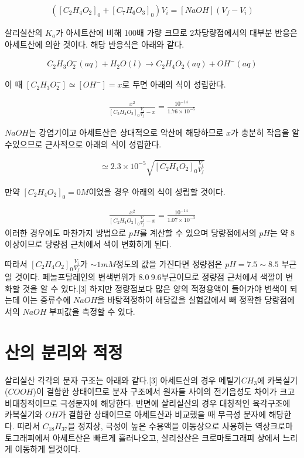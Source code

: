 \documentclass[%
 reprint,
 amsmath,amssymb,
 aps,
]{revtex4-2}
\begin{document}
\begin{align}
	([C_{2}H_{4}O_{2}]_{0}+[C_{7}H_{6}O_{3}]_{0})V_{i} = [NaOH](V_{f}-V_{i})
\end{align}

살리실산의 $K_{a}$가 아세트산에 비해 100배 가량 크므로 2차당량점에서의 대부분 반응은 아세트산에 의한 것이다. 해당 반응식은 아래와 같다.

\begin{align}
	C_{2}H_{3}O_{2}^{-}(aq) + H_{2}O(l) \rightarrow C_{2}H_{4}O_{2}(aq)+ OH^{-}(aq)
\end{align}

이 때 $[C_{2}H_{3}O_{2}^{-}] \simeq [OH^{-}] = x$로 두면 아래의 식이 성립한다.

\begin{align}
	\frac{x^{2}}{[C_{2}H_{4}O_{2}]_{0}\frac{V_{i}}{V_{f}}-x} = \frac{10^{-14}}{1.76\times10^{-5}}
\end{align}

$NaOH$는 강염기이고 아세트산은 상대적으로 약산에 해당하므로 $x$가 충분히 작음을 알수있으므로 근사적으로 아래의 식이 성립한다.

\begin{align}
	[OH^{-}] \simeq 2.3\times10^{-5}\sqrt{[C_{2}H_{4}O_{2}]_{0}\frac{V_{i}}{V_{f}}}
\end{align}

만약 $[C_{2}H_{4}O_{2}]_{0} = 0M$이었을 경우 아래의 식이 성립할 것이다.

\begin{align}
	\frac{x^{2}}{[C_{2}H_{4}O_{2}]_{0}\frac{V_{i}}{V_{f}}-x} = \frac{10^{-14}}{1.07\times10^{-3}}
\end{align}
이러한 경우에도 마찬가지 방법으로 $pH$를 계산할 수 있으며 당량점에서의 $pH$는 약 $8$이상이므로 당량점 근처에서 색이 변화하게 된다.

따라서 $[C_{2}H_{4}O_{2}]_{0}\frac{V_{i}}{V_{f}}$가 $\sim 1mM$정도의 값을 가진다면 정량점은 $pH = 7.5\sim8.5$ 부근일 것이다. 페놀프탈레인의 변색번위가 $8.0~9.6$부근이므로 정량점 근처에서 색깔이 변화할 것을 알 수 있다.[3] 하지만 정량점보다 많은 양의 적정용액이 들어가야 변색이 되는데 이는 증류수에 $NaOH$을 바탕적정하여 해당값을 실험값에서 빼 정확한 당량점에서의 $NaOH$ 부피값을 측정할 수 있다.

\section{\label{sec:level2}산의 분리와 적정}
살리실산 각각의 분자 구조는 아래와 같다.[3] 아세트산의 경우 메틸기$CH_{3}$에 카복실기($COOH$)이 결합한 상태이므로 분자 구조에서 원자들 사이의 전기음성도 차이가 크고 비대칭적이므로 극성분자에 해당한다. 반면에 살리실산의 경우 대칭적인 육각구조에 카복실기와 $OH$가 결합한 상태이므로 아세트산과 비교했을 때 무극성 분자에 해당한다. 따라서 $C_{18}H_{37}$을 정지상, 극성이 높은 수용액을 이동상으로 사용하는 역상크로마토그래피에서 아세트산은 빠르게 흘러나오고, 살리실산은 크로마토그래피 상에서 느리게 이동하게 될것이다.
\end{document}
